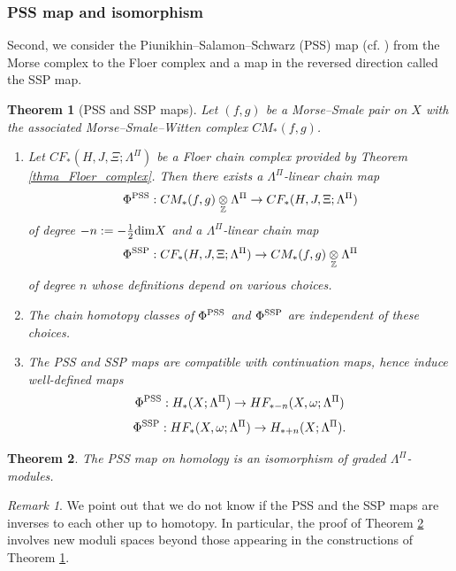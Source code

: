 \documentclass[reqno, 10pt]{amsart}
\numberwithin{equation}{section}
\numberwithin{equation}{section}
\newtheorem{thma}{Theorem}
\theoremstyle{definition}
\theoremstyle{remark}
\newtheorem{rem}[thm]{Remark}
\newcommand{\beqn}{\begin{equation*}}
\newcommand{\eeqn}{\end{equation*}}
\newcommand{\mb}{\mathbb}
\begin{document}
\subsubsection{PSS map and isomorphism}
Second, we consider the Piunikhin--Salamon--Schwarz (PSS) map (cf. \cite{PSS}) from the Morse complex to the Floer complex and a map in the reversed direction called the SSP map. 

\begin{thma}[PSS and SSP maps] \label{thma_PSS}
Let $(f, g)$ be a Morse--Smale pair on $X$ with the associated Morse--Smale--Witten complex $CM_*(f, g)$. 
\begin{enumerate}

\item Let $CF_*(H, J, \Xi; \Lambda^\Pi)$ be a Floer chain complex provided by Theorem \ref{thma_Floer_complex}. Then there exists a $\Lambda^\Pi$-linear chain map
\beqn
\Phi^{\rm PSS}: CM_*(f, g) \underset{\mb Z}{\otimes} \Lambda^\Pi \to CF_*(H, J, \Xi; \Lambda^\Pi) 
\eeqn
of degree $-n:= - \frac{1}{2} {\rm dim} X$ 
and a $\Lambda^\Pi$-linear chain map
\beqn
\Phi^{\rm SSP}: CF_*(H, J, \Xi; \Lambda^\Pi) \to CM_*(f, g) \underset{\mb Z}{\otimes} \Lambda^\Pi
\eeqn
of degree $n$ whose definitions depend on various choices. 

\item The chain homotopy classes of $\Phi^{\rm PSS}$ and $\Phi^{\rm SSP}$ are independent of these choices.

\item The PSS and SSP maps are compatible with continuation maps, hence induce well-defined maps
\beqn
\Phi^{\rm PSS}: H_*(X; \Lambda^\Pi) \to HF_{*-n}(X, \omega; \Lambda^\Pi)
\eeqn
\beqn
\Phi^{\rm SSP}: HF_*(X, \omega; \Lambda^\Pi) \to H_{*+n}(X; \Lambda^\Pi).
\eeqn

\end{enumerate}
\end{thma}

\begin{thma}\label{thma_PSS_isomorphism}
The PSS map on homology is an isomorphism of graded $\Lambda^\Pi$-modules.
\end{thma}

\begin{rem}
    We point out that we do not know if the PSS and the SSP maps are inverses to each other up to homotopy. In particular, the proof of Theorem \ref{thma_PSS_isomorphism} involves new moduli spaces beyond those appearing in the constructions of Theorem \ref{thma_PSS}.
\end{rem}
\end{document}
